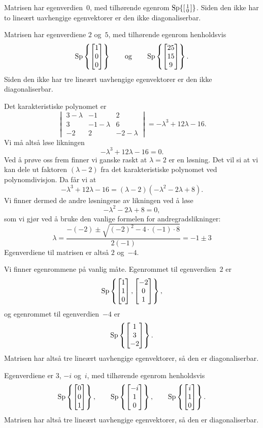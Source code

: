 \begin{losning}
\begin{punkt}
Matrisen har egenverdien~$0$, med tilhørende egenrom $\operatorname{Sp} \{ \left[ \begin{smallmatrix} 1 \\ 0 \end{smallmatrix} \right] \}$.
Siden den ikke har to lineært uavhengige egenvektorer er den
ikke diagonaliserbar.
\end{punkt}

\begin{punkt}
Matrisen har egenverdiene $2$ og~$5$, med tilhørende egenrom
henholdsvis
\[
\operatorname{Sp} \left\{ \begin{bmatrix} 1 \\ 0 \\ 0 \end{bmatrix} \right\}
\qquad\text{og}\qquad
\operatorname{Sp} \left\{ \begin{bmatrix} 25 \\ 15 \\ 9 \end{bmatrix} \right\}.
\]
Siden den ikke har tre lineært uavhengige egenvektorer er den
ikke diagonaliserbar.
\end{punkt}

\begin{punkt}
Det karakteristiske polynomet er
\[
\begin{vmatrix}
3-\lambda & -1         & 2          \\
3         & -1-\lambda & 6          \\
-2        & 2          & -2-\lambda
\end{vmatrix}
=
-\lambda^3 + 12\lambda - 16.
\]
Vi må altså løse likningen
\[
-\lambda^3 + 12\lambda - 16 = 0.
\]
Ved å prøve oss frem finner vi ganske raskt at $\lambda=2$ er en
løsning.  Det vil si at vi kan dele ut faktoren $(\lambda-2)$ fra det
karakteristiske polynomet ved polynomdivisjon.  Da får vi at
\[
-\lambda^3 + 12\lambda - 16 = (\lambda - 2) (-\lambda^2 - 2\lambda + 8).
\]
Vi finner dermed de andre løsningene av likningen ved å løse
\[
-\lambda^2 - 2\lambda + 8 = 0,
\]
som vi gjør ved å bruke den vanlige formelen for andregradslikninger:
\[
\lambda
 = \frac{-(-2) \pm \sqrt{(-2)^2 - 4 \cdot (-1) \cdot 8}}{2 (-1)}
 = -1 \pm 3
\]
Egenverdiene til matrisen er altså $2$ og~$-4$.

Vi finner egenrommene på vanlig måte.  Egenrommet til egenverdien~$2$ er
\[
\operatorname{Sp} \left\{ \begin{bmatrix} 1 \\ 1 \\ 0 \end{bmatrix}, \begin{bmatrix} -2 \\ 0 \\ 1 \end{bmatrix} \right\},
\]
og egenrommet til egenverdien~$-4$ er
\[
\operatorname{Sp} \left\{ \begin{bmatrix} 1 \\ 3 \\ -2 \end{bmatrix} \right\}.
\]
Matrisen har altså tre lineært uavhengige egenvektorer, så den er
diagonaliserbar.
\end{punkt}

\begin{punkt}
Egenverdiene er $3$, $-i$ og~$i$, med tilhørende egenrom henholdsvis
\[
\operatorname{Sp} \left\{ \begin{bmatrix} 0 \\ 0 \\ 1 \end{bmatrix} \right\},\qquad
\operatorname{Sp} \left\{ \begin{bmatrix} -i \\ 1 \\ 0 \end{bmatrix} \right\},\qquad
\operatorname{Sp} \left\{ \begin{bmatrix} i \\ 1 \\ 0 \end{bmatrix} \right\}.
\]
Matrisen har altså tre lineært uavhengige egenvektorer, så den er
diagonaliserbar.
\end{punkt}


\end{losning}
